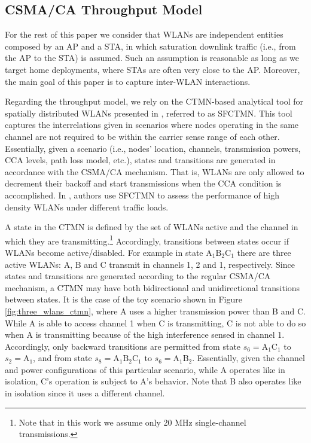 \documentclass{article}
\begin{document}
\subsection{CSMA/CA Throughput Model}
\label{section:throughput_model}		
For the rest of this paper we consider that WLANs are independent entities composed by an AP and a STA, in which saturation downlink traffic (i.e., from the AP to the STA) is assumed. Such an assumption is  reasonable as long as we target home deployments, where STAs are often very close to the AP. Moreover, the main goal of this paper is to capture inter-WLAN interactions.

Regarding the throughput model, we rely on the CTMN-based analytical tool for spatially distributed WLANs presented in \cite{barrachina2018performance}, referred to as SFCTMN. This tool captures the interrelations given in scenarios where nodes operating in the same channel are not required to be within the carrier sense range of each other. Essentially, given a scenario (i.e., nodes' location, channels, transmission powers, CCA levels, path loss model, etc.), states and transitions are generated in accordance with the CSMA/CA mechanism. That is, WLANs are only allowed to decrement their backoff and start transmissions when the CCA condition is accomplished. In \cite{barrachina2018overlap}, authors use SFCTMN to assess the performance of high density WLANs under different traffic loads.

A state in the CTMN is defined by the set of WLANs active and the channel in which they are transmitting.\footnote{Note that in this work we assume only 20 MHz single-channel transmissions.} Accordingly, transitions between states occur if WLANs become active/disabled. For example in state $\text{A}_1 \text{B}_2 \text{C}_1$ there are three active WLANs: A, B and C transmit in channels 1, 2 and 1, respectively. Since states and transitions are generated according to the regular CSMA/CA mechanism, a CTMN may have both bidirectional and unidirectional transitions between states. It is the case of the toy scenario shown in Figure \ref{fig:three_wlans_ctmn}, where A uses a higher transmission power than B and C. While A is able to access channel 1 when C is transmitting, C is not able to do so when A is transmitting because of the high interference sensed in channel 1. Accordingly, only backward transitions are permitted from state $s_6 = \text{A}_1 \text{C}_1$ to $s_2 = \text{A}_1$, and from state $s_8 = \text{A}_1 \text{B}_2 \text{C}_1$ to $s_6 = \text{A}_1 \text{B}_2$. Essentially, given the channel and power configurations of this particular scenario, while A operates like in isolation, C's operation is subject to A's behavior. Note that B also operates like in isolation since it uses a different channel.
\end{document}
